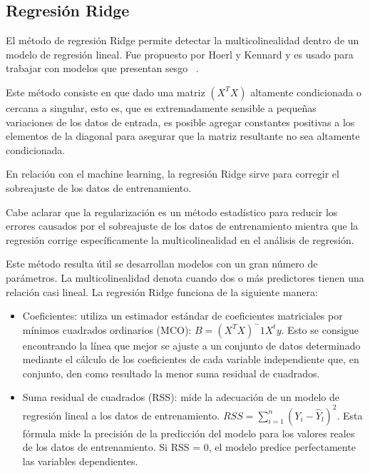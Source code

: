 \subsection{Regresión Ridge}
\label{subsubsec:eda_reg_rid}

El método de regresión Ridge permite detectar la multicolinealidad dentro de un modelo de regresión lineal. Fue propuesto por Hoerl y Kennard y es usado para trabajar con modelos que presentan sesgo ~\cite{dialnet5116534, ibmRidgeRegression}. 

Este método consiste en que dado una matriz $(X^T X)$ altamente condicionada o cercana a singular, esto es, que es extremadamente sensible a pequeñas variaciones de los datos de entrada, es posible agregar constantes positivas a los elementos de la diagonal para asegurar que la matriz resultante no sea altamente condicionada.

En relación con el machine learning, la regresión Ridge sirve para corregir el sobreajuste de los datos de entrenamiento. 

Cabe aclarar que la regularización es un método estadístico para reducir los errores causados por el sobreajuste de los datos de entrenamiento mientra que la regresión corrige específicamente la multicolinealidad en el análisis de regresión.

Este método resulta útil se desarrollan modelos con un gran número de parámetros. La multicolinealidad denota cuando dos o más predictores tienen una relación casi lineal. La regresión Ridge funciona de la siguiente manera:

\begin{itemize}
 \item Coeficientes: utiliza un estimador estándar de coeficientes matriciales por mínimos cuadrados ordinarios (MCO): $B = (X^T X)^-1 X^t y$. Esto se consigue encontrando la línea que mejor se ajuste a un conjunto de datos determinado mediante el cálculo de los coeficientes de cada variable independiente que, en conjunto, den como resultado la menor suma residual de cuadrados.
 
 \item Suma residual de cuadrados (RSS): mide la adecuación de un modelo de regresión lineal a los datos de entrenamiento. $RSS = \sum_{i=1}^{n} (Y_i - \hat{Y}_l)^2$. Esta fórmula mide la precisión de la predicción del modelo para los valores reales de los datos de entrenamiento. Si RSS = 0, el modelo predice perfectamente las variables dependientes.
\end{itemize}

